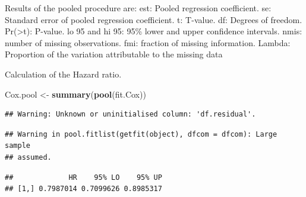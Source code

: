 \documentclass[]{book}
\newenvironment{Shaded}{\begin{snugshade}}{\end{snugshade}}
\newcommand{\KeywordTok}[1]{\textcolor[rgb]{0.13,0.29,0.53}{\textbf{#1}}}
\newcommand{\DataTypeTok}[1]{\textcolor[rgb]{0.13,0.29,0.53}{#1}}
\newcommand{\DecValTok}[1]{\textcolor[rgb]{0.00,0.00,0.81}{#1}}
\newcommand{\FloatTok}[1]{\textcolor[rgb]{0.00,0.00,0.81}{#1}}
\newcommand{\StringTok}[1]{\textcolor[rgb]{0.31,0.60,0.02}{#1}}
\newcommand{\OperatorTok}[1]{\textcolor[rgb]{0.81,0.36,0.00}{\textbf{#1}}}
\newcommand{\NormalTok}[1]{#1}
\begin{document}
Results of the pooled procedure are: est: Pooled regression coefficient.
se: Standard error of pooled regression coefficient. t: T-value. df:
Degrees of freedom. Pr(\textgreater{}\textbar{}t\textbar{}): P-value. lo
95 and hi 95: 95\% lower and upper confidence intervals. nmis: number of
missing observations. fmi: fraction of missing information. Lambda:
Proportion of the variation attributable to the missing data

Calculation of the Hazard ratio.

\begin{Shaded}
\begin{Highlighting}[]
\NormalTok{Cox.pool <-}\StringTok{ }\KeywordTok{summary}\NormalTok{(}\KeywordTok{pool}\NormalTok{(fit.Cox))}
\end{Highlighting}
\end{Shaded}

\begin{verbatim}
## Warning: Unknown or uninitialised column: 'df.residual'.
\end{verbatim}

\begin{verbatim}
## Warning in pool.fitlist(getfit(object), dfcom = dfcom): Large sample
## assumed.
\end{verbatim}

\begin{Shaded}
\end{Shaded}

\begin{verbatim}
##             HR    95% LO    95% UP
## [1,] 0.7987014 0.7099626 0.8985317
\end{verbatim}

\begin{Shaded}
\end{Shaded}
\end{document}
